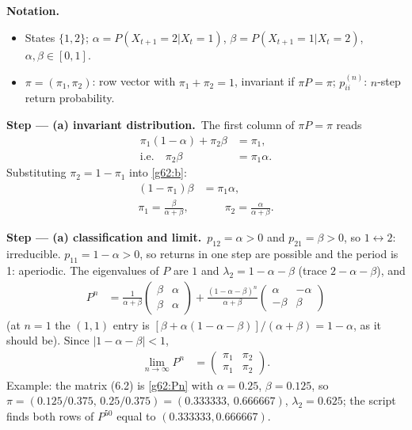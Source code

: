 \documentclass[11pt,a4paper]{article}
\newenvironment{notacao}{\par\smallskip\noindent\textbf{Notation.}\begin{itemize}[leftmargin=1.4em,topsep=1pt,itemsep=0pt]\small}{\end{itemize}}
\newcommand{\passo}[2]{\par\smallskip\noindent\textbf{Step --- #1.}~#2}
\begin{document}
\begin{sol}
\begin{notacao}
\item States $\{1,2\}$; $\alpha=P(X_{t+1}=2|X_t=1)$, $\beta=P(X_{t+1}=1|X_t=2)$, $\alpha,\beta\in[0,1]$.
\item $\pi=(\pi_1,\pi_2)$: row vector with $\pi_1+\pi_2=1$, invariant if $\pi P=\pi$; $p_{ii}^{(n)}$: $n$-step return probability.
\end{notacao}
\passo{(a) invariant distribution}{The first column of $\pi P=\pi$ reads
\begin{align}
\pi_1(1-\alpha)+\pi_2\beta&=\pi_1,\label{g62:a}\\
\text{i.e.}\quad\pi_2\beta&=\pi_1\alpha.\label{g62:b}
\end{align}
Substituting $\pi_2=1-\pi_1$ into \eqref{g62:b}:
\begin{align}
(1-\pi_1)\beta&=\pi_1\alpha,\label{g62:c}\\
\pi_1=\frac{\beta}{\alpha+\beta},&\qquad\pi_2=\frac{\alpha}{\alpha+\beta}.\label{g62:pi}
\end{align}}
\passo{(a) classification and limit}{$p_{12}=\alpha>0$ and $p_{21}=\beta>0$, so $1\leftrightarrow2$: irreducible. $p_{11}=1-\alpha>0$, so returns in one step are possible and the period is 1: aperiodic. The eigenvalues of $P$ are $1$ and $\lambda_2=1-\alpha-\beta$ (trace $2-\alpha-\beta$), and
\begin{align}
P^n&=\frac{1}{\alpha+\beta}\begin{pmatrix}\beta&\alpha\\ \beta&\alpha\end{pmatrix}+\frac{(1-\alpha-\beta)^n}{\alpha+\beta}\begin{pmatrix}\alpha&-\alpha\\ -\beta&\beta\end{pmatrix}\label{g62:Pn}
\end{align}
(at $n=1$ the $(1,1)$ entry is $[\beta+\alpha(1-\alpha-\beta)]/(\alpha+\beta)=1-\alpha$, as it should be). Since $|1-\alpha-\beta|<1$,
\begin{align}
\lim_{n\to\infty}P^n&=\begin{pmatrix}\pi_1&\pi_2\\ \pi_1&\pi_2\end{pmatrix}.\label{g62:lim}
\end{align}
Example: the matrix (6.2) is \eqref{g62:Pn} with $\alpha=0.25$, $\beta=0.125$, so $\pi=(0.125/0.375,\,0.25/0.375)=(0.333333,\,0.666667)$, $\lambda_2=0.625$; the script finds both rows of $P^{50}$ equal to $(0.333333,0.666667)$.}

\end{sol}
\end{document}
